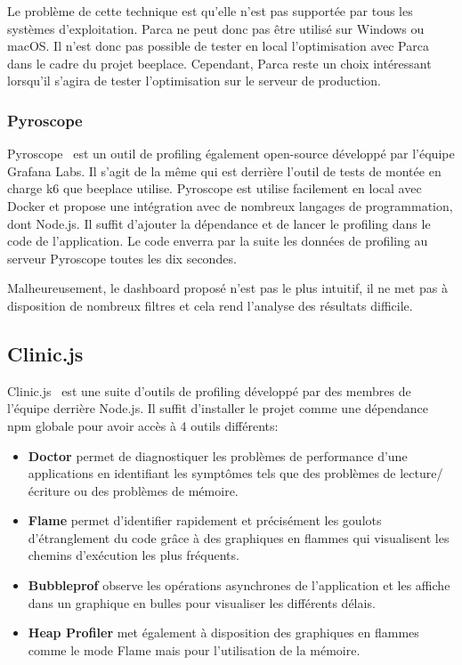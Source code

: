 Le problème de cette technique est qu'elle n'est pas supportée par tous les systèmes d'exploitation. Parca ne peut donc pas être utilisé sur Windows ou macOS. Il n'est donc pas possible de tester en local l'optimisation avec Parca dans le cadre du projet \gls{beeplace}. Cependant, Parca reste un choix intéressant lorsqu'il s'agira de tester l'optimisation sur le serveur de production.

\subsubsection{Pyroscope}

Pyroscope~\cite{pyroscope} est un outil de profiling également open-source développé par l'équipe Grafana Labs. Il s'agit de la même qui est derrière l'outil de tests de montée en charge k6 que \gls{beeplace} utilise. Pyroscope est utilise facilement en local avec Docker et propose une intégration avec de nombreux langages de programmation, dont Node.js. Il suffit d'ajouter la dépendance et de lancer le profiling dans le code de l'application. Le code enverra par la suite les données de profiling au serveur Pyroscope toutes les dix secondes.

Malheureusement, le dashboard proposé n'est pas le plus intuitif, il ne met pas à disposition de nombreux filtres et cela rend l'analyse des résultats difficile.

\subsection{Clinic.js}

Clinic.js~\cite{clinicjs} est une suite d'outils de profiling développé par des membres de l'équipe derrière Node.js. Il suffit d'installer le projet comme une dépendance \gls{npm} globale pour avoir accès à 4 outils différents:

\begin{itemize}
  \item \textbf{Doctor} permet de diagnostiquer les problèmes de performance d'une applications en identifiant les symptômes tels que des problèmes de lecture/écriture ou des problèmes de mémoire.
  \item \textbf{Flame} permet d'identifier rapidement et précisément les goulots d'étranglement du code grâce à des graphiques en flammes qui visualisent les chemins d'exécution les plus fréquents.
  \item \textbf{Bubbleprof} observe les opérations asynchrones de l'application et les affiche dans un graphique en bulles pour visualiser les différents délais.
  \item \textbf{Heap Profiler} met également à disposition des graphiques en flammes comme le mode Flame mais pour l'utilisation de la mémoire.
\end{itemize}

